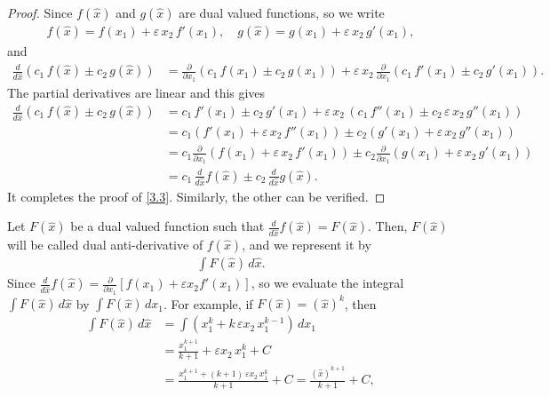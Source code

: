 \documentclass[11pt,a4paper,fleqn]{article}
\numberwithin{equation}{section}
\numberwithin{lemma}{section}
\numberwithin{theorem}{section}
\numberwithin{corollary}{section}
\begin{document}
\begin{proof}
	Since $f(\widehat{x})$ and $g(\widehat{x})$ are dual valued functions, so we write
	\begin{align*}
	f(\widehat{x}) = f(x_1) + \varepsilon \, x_2 \, f'(x_1), \quad g(\widehat{x}) = g(x_1) + \varepsilon \, x_2 \,  g'(x_1),
	\end{align*}
and 
\begin{align*}
	\frac{d}{d \widehat{x}} (c_1 \, f(\widehat{x}) \pm c_2 \, g(\widehat{x})) & = \frac{\partial}{\partial x_1} (c_1 \, f( {x_1}) \pm c_2 \, g( {x_1})) + \varepsilon \, x_2 \, \frac{\partial}{\partial x_1} (c_1 \, f'( {x_1}) \pm c_2 \, g'( {x_1})).
\end{align*}
The partial derivatives are linear and this gives 
\begin{align*}
	\frac{d}{d \widehat{x}} (c_1 \, f(\widehat{x}) \pm c_2 \, g(\widehat{x})) & = c_1 \, f'( {x_1}) \pm c_2 \, g'( {x_1}) + \varepsilon \, x_2 \, ( c_1 \, f''( {x_1}) \pm  c_2 \, \varepsilon \, x_2 \, g''( {x_1}))\nonumber\\
	& = c_1   (f'(x_1) + \varepsilon \, x_2 \, f'' (x_1)) \pm c_2  (g'(x_1) + \varepsilon \, x_2 \, g'' (x_1))\nonumber\\
	& = c_1 \frac{\partial}{\partial x_1} (f(x_1) + \varepsilon \, x_2 \, f' (x_1)) \pm c_2 \frac{\partial}{\partial x_1} (g(x_1) + \varepsilon \, x_2 \, g' (x_1))\nonumber\\
	& = c_1 \, \frac{d}{d\widehat{x}} f(\widehat{x}) \pm c_2 \, \frac{d}{d\widehat{x}} g(\widehat{x}).
\end{align*}
It completes the proof of \eqref{3.3}. Similarly, the other can be verified. 
\end{proof}
Let $F(\widehat{x})$ be a dual valued function such that $\frac{d}{d \widehat{x}} f(\widehat{x}) = F(\widehat{x})$. Then, $F(\widehat{x})$ will be called dual anti-derivative of $f(\widehat{x})$, and we represent it by 
\begin{align}
	\int F(\widehat{x}) \, d \widehat{x}.
\end{align}
Since $\frac{d}{d \widehat{x}} f(\widehat{x}) = \frac{\partial}{\partial x_1} [f(x_1) + \varepsilon x_2 f'(x_1)]$, so we evaluate the integral $\int F(\widehat{x}) \, d \widehat{x}$ by $\int F(\widehat{x}) \, d {x_1}$. For example, if $F(\widehat{x}) = (\widehat{x})^k$, then 
\begin{align*}
	\int F(\widehat{x}) \, d \widehat{x} &= \int (x_1^k + k \,  \varepsilon x_2 \, x_1^{k - 1}) \, dx_1\\
	& = \frac{x_1^{k + 1}}{k + 1} + \varepsilon x_2 \, {x_1^k} + C\\
	& = \frac{x_1^{k + 1} + (k + 1) \, \varepsilon x_2 \, x_1^k}{k + 1} + C  = \frac{(\widehat{x})^{k + 1}}{k + 1} + C, 
\end{align*}
\end{document}
